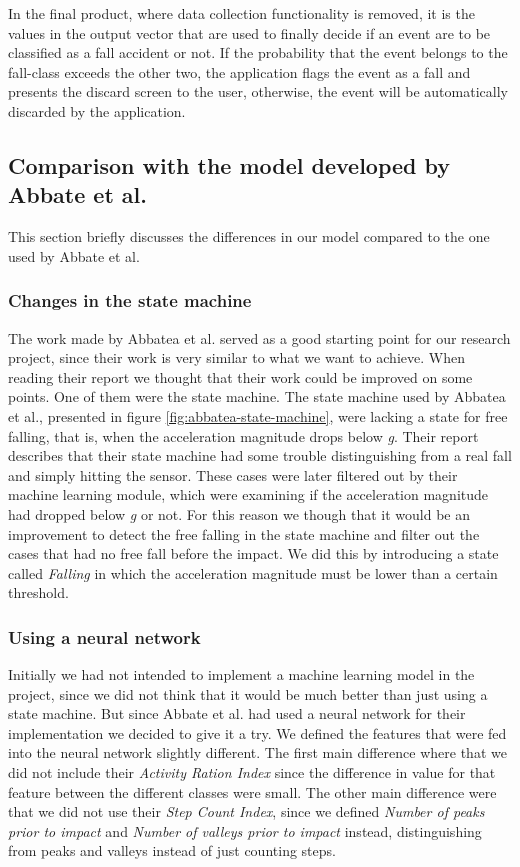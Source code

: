 \documentclass[12pt, a4paper, onecolumn]{article}
\begin{document}
	In the final product, where data collection functionality is removed, it is the values in the output vector that are used to finally decide if an event are to be classified as a fall accident or not. If the probability that the event belongs to the fall-class exceeds the other two, the application flags the event as a fall and presents the discard screen to the user, otherwise, the event will be automatically discarded by the application. 
	
	
	\subsection{Comparison with the model developed by Abbate et al.}
	
	This section briefly discusses the differences in our model compared to the one used by Abbate et al.
	
	\subsubsection{Changes in the state machine}
	
	The work made by Abbatea et al. served as a good starting point for our research project, since their work is very similar to what we want to achieve. When reading their report we thought that their work could be improved on some points. One of them were the state machine. The state machine used by Abbatea et al., presented in figure \ref{fig:abbatea-state-machine}, were lacking a state for free falling, that is, when the acceleration magnitude drops below \textit{g}. Their report describes that their state machine had some trouble distinguishing from a real fall and simply hitting the sensor. These cases were later filtered out by their machine learning module, which were examining if the acceleration magnitude had dropped below \textit{g} or not. For this reason we though that it would be an improvement to detect the free falling in the state machine and filter out the cases that had no free fall before the impact. We did this by introducing a state called \textit{Falling} in which the acceleration magnitude must be lower than a certain threshold.
	
	\subsubsection{Using a neural network}
	
	Initially we had not intended to implement a machine learning model in the project, since we did not think that it would be much better than just using a state machine. But since Abbate et al. had used a neural network for their implementation we decided to give it a try. We defined the features that were fed into the neural network slightly different. The first main difference where that we did not include their \textit{Activity Ration Index} since the difference in value for that feature between the different classes were small. The other main difference were that we did not use their \textit{Step Count Index}, since we defined \textit{Number of peaks prior to impact} and \textit{Number of valleys prior to impact} instead, distinguishing from peaks and valleys instead of just counting steps. 
	
\end{document}
